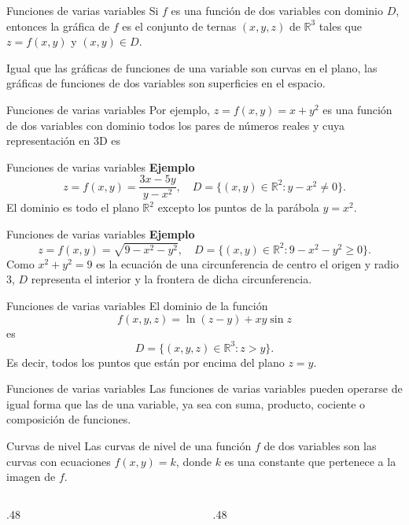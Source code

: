 \documentclass[original_version/main.tex]{subfiles}
\begin{document}
\begin{frame}{Funciones de varias variables}
\small Si $f$ es una función de dos variables con dominio $D$, entonces la gráfica de $f$ es el conjunto de ternas $(x,y,z)$ de $\mathbb{R}^3$ tales que $z=f(x,y)$ y $(x,y)\in D$.
\medskip

Igual que las gráficas de funciones de una variable son curvas en el plano, las gráficas de funciones de dos variables son superficies en el espacio.
\end{frame}
\begin{frame}{Funciones de varias variables}
Por ejemplo, $z=f(x,y)=x+y^2$ es una función de dos variables con dominio todos los pares de números reales y cuya representación en 3D es
\end{frame}
\begin{frame}{Funciones de varias variables}
\textbf{Ejemplo}
\[z=f(x,y)=\frac{3x-5y}{y-x^2},\quad D=\{(x,y)\in\mathbb{R}^2:y-x^2\ne0\}.\]
El dominio es todo el plano $\mathbb{R}^2$ excepto los puntos de la parábola $y=x^2$.
\end{frame}
\begin{frame}{Funciones de varias variables}
\textbf{Ejemplo}
\[z=f(x,y)=\sqrt{9-x^2-y^2},\quad D=\{(x,y)\in\mathbb{R}^2:9-x^2-y^2\ge0\}.\]
\small Como $x^2+y^2=9$ es la ecuación de una circunferencia de centro el origen y radio $3$, $D$ representa el interior y la frontera de dicha circunferencia.
\end{frame}
\begin{frame}{Funciones de varias variables}
El dominio de la función
\[f(x,y,z)=\ln(z-y)+xy\sin z\]
es
\[D=\{(x,y,z)\in\mathbb{R}^3:z>y\}.\]
Es decir, todos los puntos que están por encima del plano $z=y$.
\end{frame}
\begin{frame}{Funciones de varias variables}
Las funciones de varias variables pueden operarse de igual forma que las de una variable, ya sea con suma, producto, cociente o composición de funciones.
\end{frame}
\begin{frame}{Curvas de nivel}
Las curvas de nivel de una función $f$ de dos variables son las curvas con ecuaciones $f(x,y)=k$, donde $k$ es una constante que pertenece a la imagen de $f$.
\begin{columns}[c]
\begin{column}{.48\textwidth}\end{column}
\begin{column}{.48\textwidth}\end{column}
\end{columns}
\end{frame}
\end{document}
